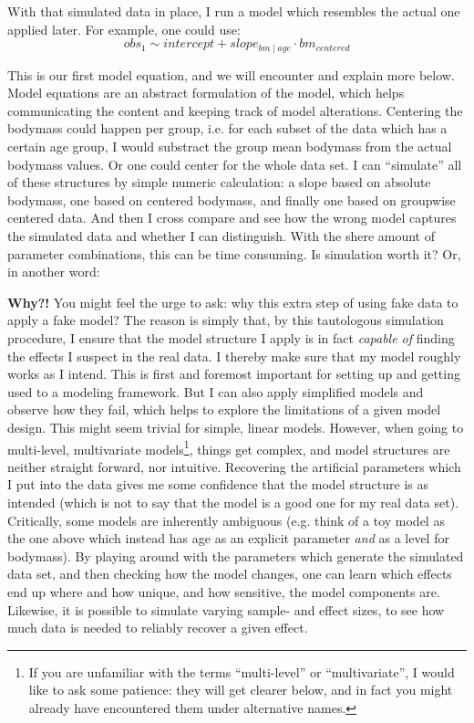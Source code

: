 With that simulated data in place, I run a model which resembles the actual one applied later.
For example, one could use:
\begin{equation} obs_{1} \sim intercept + slope_{bm\mid age} \cdot bm_{centered} \label{eq:exampleformula} \end{equation}

This is our first model equation, and we will encounter and explain more below.
Model equations are an abstract formulation of the model, which helps communicating the content and keeping track of model alterations.
Centering the bodymass could happen per group, i.e. for each subset of the data which has a certain age group, I would substract the group mean bodymass from the actual bodymass values.
Or one could center for the whole data set.
I can ``simulate'' all of these structures by simple numeric calculation: a slope based on absolute bodymass, one based on centered bodymass, and finally one based on groupwise centered data.
And then I cross compare and see how the wrong model captures the simulated data and whether I can distinguish.
With the shere amount of parameter combinations, this can be time consuming.
Is simulation worth it? Or, in another word:

\textbf{Why?!} You might feel the urge to ask: why this extra step of using fake data to apply a fake model?
The reason is simply that, by this tautologous simulation procedure, I ensure that the model structure I apply is in fact \emph{capable of} finding the effects I suspect in the real data.
I thereby make sure that my model roughly works as I intend.
This is first and foremost important for setting up and getting used to a modeling framework.
But I can also apply simplified models and observe how they fail, which helps to explore the limitations of a given model design.
This might seem trivial for simple, linear models.
However, when going to multi-level, multivariate models\footnote{If you are unfamiliar with the terms ``multi-level'' or ``multivariate'', I would like to ask some patience: they will get clearer below, and in fact you might already have encountered them under alternative names.}, things get complex, and model structures are neither straight forward, nor intuitive.
Recovering the artificial parameters which I put into the data gives me some confidence that the model structure is as intended (which is not to say that the model is a good one for my real data set).
Critically, some models are inherently ambiguous (e.g. think of a toy model as the one above which instead has age as an explicit parameter \emph{and} as a level for bodymass).
By playing around with the parameters which generate the simulated data set, and then checking how the model changes, one can learn which effects end up where and how unique, and how sensitive, the model components are.
Likewise, it is possible to simulate varying sample- and effect sizes, to see how much data is needed to reliably recover a given effect.

